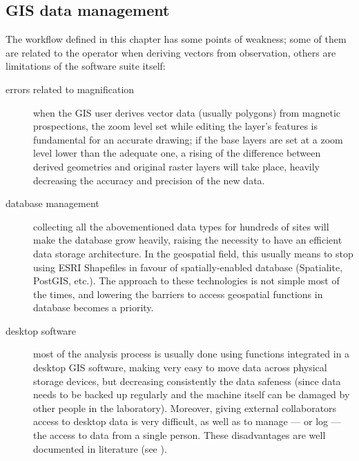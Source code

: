         \subsection{GIS data management\label{sec:gis-data-management}}
            The workflow defined in this chapter has some points of weakness; some of them are related to the operator when deriving vectors from observation, others are limitations of the software suite itself:
            \begin{description}
                \item[errors related to magnification] when the GIS user derives vector data (usually polygons) from magnetic prospections, the zoom level set while editing the layer's features is fundamental for an accurate drawing; if the base layers are set at a zoom level lower than the adequate one, a rising of the difference between derived geometries and original raster layers will take place, heavily decreasing the accuracy and precision of the new data.
                \item[database management] collecting all the abovementioned data types for hundreds of sites will make the database grow heavily, raising the necessity to have an efficient data storage architecture. In the geospatial field, this usually means to stop using ESRI Shapefiles in favour of spatially-enabled database (Spatialite, PostGIS, etc.). The approach to these technologies is not simple most of the times, and lowering the barriers to access geospatial functions in database becomes a priority.
                \item[desktop software] most of the analysis process is usually done using functions integrated in a desktop GIS software, making very easy to move data across physical storage devices, but decreasing consistently the data safeness (since data needs to be backed up regularly and the machine itself can be damaged by other people in the laboratory). Moreover, giving external collaborators access to desktop data is very difficult, as well as to manage --- or log --- the access to data from a single person. These disadvantages are well documented in literature (see \cite[p.~19]{fronza-informatica}).
            \end{description}
